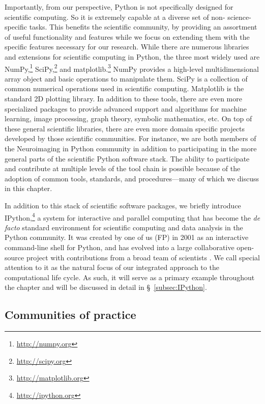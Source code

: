 \documentclass[11pt,oneside,english]{article}
\begin{document}
Importantly, from our perspective, Python is not specifically designed for
scientific computing.  So it is extremely capable at a diverse set of non-
science-specific tasks. This benefits the scientific community, by providing an
assortment of useful functionality and features while we focus on extending
them with the specific features necessary for our research.  While there are
numerous libraries and extensions for scientific computing in Python, the three
most widely used are NumPy,\footnote{\url{http://numpy.org}}
SciPy,\footnote{\url{http://scipy.org}} and
matplotlib.\footnote{\url{http://matplotlib.org}}  NumPy \cite{van2011numpy}
provides a high-level multidimensional array object and basic operations to
manipulate them. SciPy is a collection of common numerical operations used in
scientific computing.  Matplotlib \cite{hunter2007matplotlib,
hunter2012matplotlib} is the standard 2D plotting library. In addition to these
tools, there are even more specialized packages to provide advanced support and
algorithms for machine learning, image processing, graph theory, symbolic
mathematics, etc. On top of these general scientific libraries, there are even
more domain specific projects developed by those scientific communities. For
instance, we are both members of the Neuroimaging in Python \cite{MIL-BRE:2007}
community in addition to participating in the more general parts of the
scientific Python software stack. The ability to participate and contribute at
multiple levels of the tool chain is possible because of the adoption of common
tools, standards, and procedures---many of which we discuss in this chapter.

In addition to this stack of scientific software packages, we briefly
introduce IPython,\footnote{\url{http://ipython.org}} a system for interactive
and parallel computing that has become the \emph{de facto} standard environment
for scientific computing and data analysis in the Python community.  It was
created by one of us (FP) in 2001 as an interactive command-line shell for
Python, and has evolved into a large collaborative open-source project with
contributions from a broad team of scientists \cite{PER-GRA:2007}. We call
special attention to it as the natural focus of our integrated approach to the
computational life cycle. As such, it will serve as a primary example
throughout the chapter and will be discussed in detail in §~\ref{subsec:IPython}.

\subsection{\label{subsec:community}Communities of practice}
\end{document}
